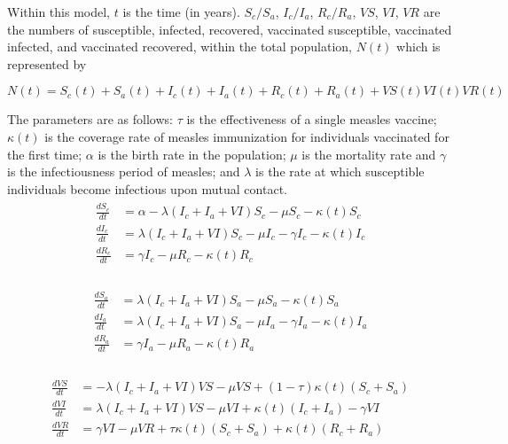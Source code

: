 \documentclass[letter,12pt, usenames,dvipsnames]{article}
\begin{document}
\pagebreak

Within this model, $t$ is the time (in years). $S_c /S_a$, $I_c/I_a$, $R_c/R_a$, $VS$, $VI$, $VR$ are the numbers of susceptible, infected, recovered, vaccinated susceptible, vaccinated infected, and vaccinated recovered, within the total population, $N(t)$ which is represented by 

$$N(t) = S_c(t) + S_a(t)+ I_c(t)+I_a(t) + R_c(t) + R_a(t)+VS(t) VI(t) VR(t)$$

The parameters are as follows: $\tau$ is the effectiveness of a single measles vaccine; $\kappa (t)$ is the coverage rate of measles immunization for individuals vaccinated for the first time; $\alpha$ is the birth rate in the population; $\mu$ is the mortality rate and $\gamma$ is the infectiousness period of measles; and $\lambda$ is the rate at which susceptible individuals become infectious upon mutual contact.\\[2ex]


\begin{align}
\label{eqn:MeaslesUnder5}
\begin{split}
\frac{dS_{c}}{dt} &= \alpha -\lambda (I_c+I_a+VI) S_c - \mu S_c - \kappa (t) S_c\\
\frac{dI_{c}}{dt} &=\lambda (I_c+I_a+VI) S_c - \mu I_c - \gamma I_c - \kappa(t)I_c\\
\frac{dR_{c}}{dt} &= \gamma I_c - \mu R_c -\kappa (t)R_c\\[3ex]
\end{split}
\end{align}

\begin{align}
\label{eqn:MeaslesOver5}
\begin{split}
\frac{dS_{a}}{dt} &= \lambda (I_c+I_a+VI) S_a - \mu S_a - \kappa (t) S_a\\
\frac{dI_{a}}{dt} &=\lambda (I_c+I_a+VI) S_a - \mu I_a - \gamma I_a - \kappa(t)I_a\\
\frac{dR_{a}}{dt} &= \gamma I_a - \mu R_a -\kappa (t)R_a\\[3ex]
\end{split}
\end{align}

\begin{align}
\label{eqn:MeaslesVaccinated}
\begin{split}
\frac{dVS}{dt} &= -\lambda (I_c+I_a+VI)VS - \mu VS + (1-\tau ) \kappa (t) (S_c +  S_a)\\
\frac{dVI}{dt} &= \lambda (I_c+I_a+VI) VS - \mu VI + \kappa (t)(I_c+ I_a) -\gamma VI\\
\frac{dVR}{dt} &= \gamma VI - \mu VR +\tau\kappa (t)(S_c +S_a)+ \kappa (t)(R_c + R_a)
\end{split}
\end{align}
\end{document}
